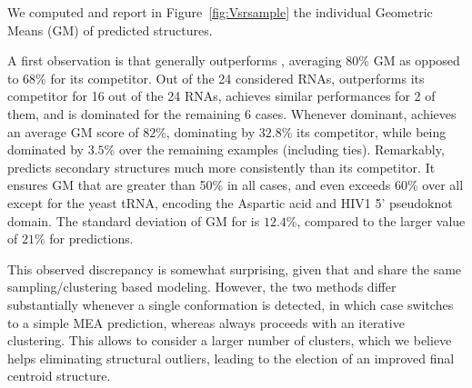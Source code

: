 \documentclass[a4,center,fleqn]{NAR}
\begin{document}
We computed and report in Figure~\ref{fig:Vsrsample} the individual Geometric Means (GM) of predicted structures. 


A first observation is that \OurTool generally outperforms , averaging $80\%$ GM as opposed to $68\%$ for its competitor. 
Out of the 24 considered RNAs, \OurTool outperforms its competitor for 16 out of the 24 RNAs, achieves similar performances for 2 of them, and is dominated for the remaining 6 cases. Whenever dominant, \OurTool achieves an average GM score of $82\%$, dominating by $32.8\%$ its competitor, while being dominated by $3.5\%$ over the remaining examples (including ties). 
Remarkably, \OurTool predicts secondary structures much more consistently than its competitor. 
It ensures GM that are greater than 50\% in all cases, and even exceeds 60\% over all except for the yeast tRNA, encoding the Aspartic acid and HIV1 5' pseudoknot domain. The standard deviation of GM for \OurTool is $12.4\%$, compared to the larger value of $21\%$ for  predictions.





This observed discrepancy is somewhat surprising, given that \OurTool and  share the same sampling/clustering based modeling. However, the two methods differ substantially whenever a single conformation is detected, in which case  switches to a simple MEA prediction, whereas \OurTool{} always proceeds with an iterative clustering. This allows \OurTool{} to consider a larger number of clusters, which we believe helps eliminating structural outliers, leading to the election of an improved final centroid structure. 
\end{document}
